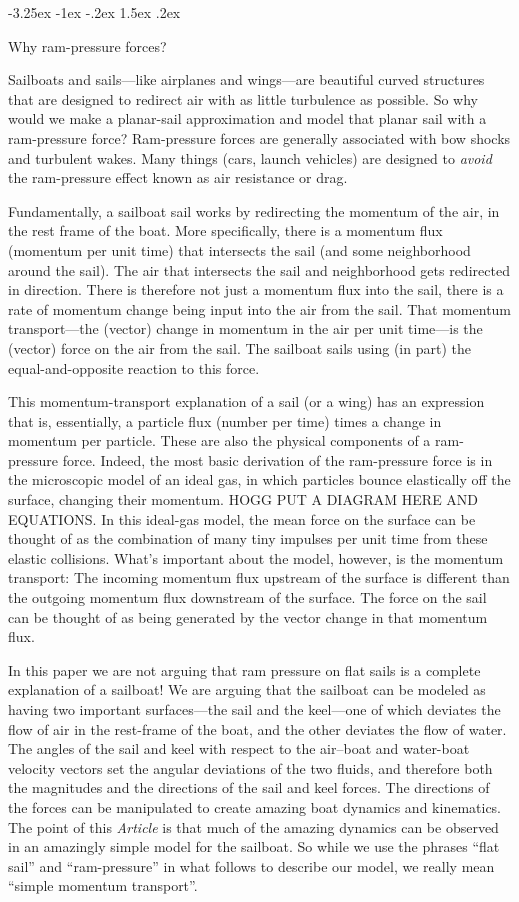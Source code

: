 \documentclass[letterpaper]{article}
\makeatletter
\newcommand{\documentname}{\textsl{Article}}
\renewcommand\section{\@startsection {section}{1}{\z@}%
  {-3.25ex \@plus -1ex \@minus -.2ex}%
  {1.5ex \@plus .2ex}%
  {\raggedright\normalfont\large\bfseries}}
\makeatother
\begin{document}
\section{Why ram-pressure forces?}\label{sec:ram}

Sailboats and sails---like airplanes and wings---are beautiful curved structures that are designed to redirect air with as little turbulence as possible.
So why would we make a planar-sail approximation and model that planar sail with a ram-pressure force?
Ram-pressure forces are generally associated with bow shocks and turbulent wakes.
Many things (cars, launch vehicles) are designed to \emph{avoid} the ram-pressure effect known as air resistance or drag.

Fundamentally, a sailboat sail works by redirecting the momentum of the air, in the rest frame of the boat.
More specifically, there is a momentum flux (momentum per unit time) that intersects the sail (and some neighborhood around the sail).
The air that intersects the sail and neighborhood gets redirected in direction.
There is therefore not just a momentum flux into the sail, there is a rate of momentum change being input into the air from the sail.
That momentum transport---the (vector) change in momentum in the air per unit time---is the (vector) force on the air from the sail.
The sailboat sails using (in part) the equal-and-opposite reaction to this force.

This momentum-transport explanation of a sail (or a wing) has an expression that is, essentially, a particle flux (number per time) times a change in momentum per particle.
These are also the physical components of a ram-pressure force.
Indeed, the most basic derivation of the ram-pressure force is in the microscopic model of an ideal gas, in which particles bounce elastically off the surface, changing their momentum.
HOGG PUT A DIAGRAM HERE AND EQUATIONS.
In this ideal-gas model, the mean force on the surface can be thought of as the combination of many tiny impulses per unit time from these elastic collisions.
What's important about the model, however, is the momentum transport:
The incoming momentum flux upstream of the surface is different than the outgoing momentum flux downstream of the surface.
The force on the sail can be thought of as being generated by the vector change in that momentum flux.

In this paper we are not arguing that ram pressure on flat sails is a complete explanation of a sailboat!
We are arguing that the sailboat can be modeled as having two important surfaces---the sail and the keel---one of which deviates the flow of air in the rest-frame of the boat, and the other deviates the flow of water.
The angles of the sail and keel with respect to the air--boat and water-boat velocity vectors set the angular deviations of the two fluids, and therefore both the magnitudes and the directions of the sail and keel forces.
The directions of the forces can be manipulated to create amazing boat dynamics and kinematics.
The point of this \documentname{} is that much of the amazing dynamics can be observed in an amazingly simple model for the sailboat.
So while we use the phrases ``flat sail'' and ``ram-pressure'' in what follows to describe our model, we really mean ``simple momentum transport''.
\end{document}
